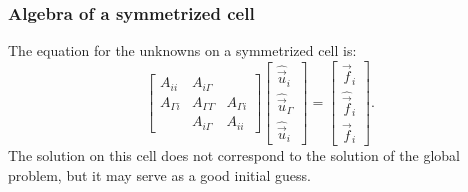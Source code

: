 \documentclass{beamer}
\begin{document}
\begin{frame}
\frametitle{Algebra of a symmetrized cell}

The equation for the unknowns on a symmetrized cell is:
\begin{equation} \label{eq: sym cell}
	\begin{bmatrix}
		A_{ii} & A_{i \Gamma} \\
		A_{\Gamma i} & A_{\Gamma \Gamma} & A_{\Gamma i} \\
		& A_{i \Gamma} & A_{ii}
	\end{bmatrix}
	\begin{bmatrix} \hat{\vec{u}}_i \\ \hat{\vec{u}}_\Gamma \\ \hat{\vec{u}}_i \end{bmatrix}
	=
	\begin{bmatrix} \vec{f}_i \\ \hat{\vec{f}}_i \\ \vec{f}_i \end{bmatrix}.
\end{equation}
The solution on this cell does not correspond to the solution of the global problem, but it may serve as a good initial guess.
\end{frame}
\end{document}
